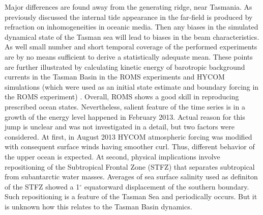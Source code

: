 \documentclass[12pt]{article}
\begin{document}
Major differences are found away from the generating ridge, near Tasmania. As previously discussed 
the internal tide appearance in the far-field is produced by refraction on inhomogeneities in 
oceanic media. Then any biases in the simulated dynamical state of the Tasman sea will lead to 
biases in the beam characteristics. As well small number and short temporal coverage of the 
performed experiments are by no means sufficient to derive a statistically adequate mean. These 
points are further illustrated by calculating kinetic energy of barotropic background currents in 
the Tasman Basin in the ROMS experiments and HYCOM simulations (which were used as an initial 
state estimate and boundary forcing in the ROMS experiment) . Overall, 
ROMS shows a good skill in reproducing prescribed ocean states. Nevertheless, salient 
feature of the time series is in a growth of the energy level happened in February 2013. Actual 
reason for this jump is unclear and was not investigated in a detail, but two factors were 
considered. At first, in August 2013 HYCOM atmospheric forcing was modified with consequent surface 
winds having smoother curl. Thus, different behavior of the upper ocean is expected. At second, 
physical implications involve repositioning of the Subtropical Frontal Zone (STFZ) that separates  
subtropical from subantarctic water masses. Averages of sea surface salinity used as definiton of 
the STFZ showed a 1$^{\circ}$ equatorward displacement of the southern boundary. Such 
repositioning is a feature of the Tasman Sea and periodically occurs. But it is unknown how this 
relates to the Tasman Basin dynamics.\\
\end{document}
